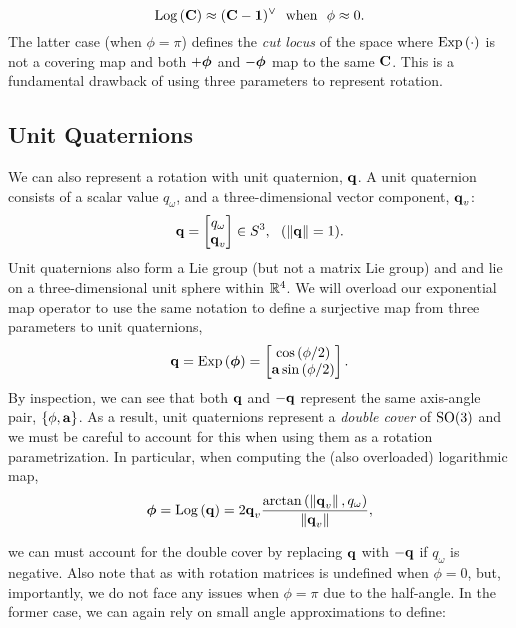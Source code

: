 \begin{equation}
	\mathrm{Log}\left({\boldsymbol{\mathbf{C}}}\right) \approx (\boldsymbol{\mathbf{C}} - \boldsymbol{\mathbf{1}})^\vee ~~ \textrm{when} ~~ \phi \approx 0. 
\end{equation}
The latter case (when $\phi = \pi$) defines the \textit{cut locus} of the space where $\mathrm{Exp}\left({\cdot}\right)$ is not a covering map and both $+\boldsymbol{\mathbf{\phi}}$ and $-\boldsymbol{\mathbf{\phi}}$ map to the same $\boldsymbol{\mathbf{C}}$. This is a fundamental drawback of using three parameters to represent rotation.

\subsection{Unit Quaternions}

We can also represent a rotation with unit quaternion, $\boldsymbol{\mathbf{q}}$. A unit quaternion consists of a scalar value $q_\omega$, and a three-dimensional vector component, $\boldsymbol{\mathbf{q}}_v$:
\begin{equation}
	\boldsymbol{\mathbf{q}} = \begin{bmatrix} q_\omega \\ \boldsymbol{\mathbf{q}}_v \end{bmatrix} \in S^3, ~~ (\left\Vert\boldsymbol{\mathbf{q}}\right\Vert = 1).
\end{equation}
Unit quaternions also form a Lie group \citep{Sola2018-kg} (but not a matrix Lie group) and and lie on a three-dimensional unit sphere within $\mathbb{R}{}^4$. We will overload our exponential map operator to use the same notation to define a surjective map from three parameters to unit quaternions,
\begin{equation}
\boldsymbol{\mathbf{q}} = \mathrm{Exp}\left({\boldsymbol{\mathbf{\phi}}}\right) = \begin{bmatrix} \cos{(\phi/2)} \\ \boldsymbol{\mathbf{a}} \sin{(\phi/2)} \end{bmatrix}.	
\end{equation}
By inspection, we can see that both $\boldsymbol{\mathbf{q}}$ and $-\boldsymbol{\mathbf{q}}$ represent the same axis-angle pair, $\{\phi, \boldsymbol{\mathbf{a}}\}$. As a result, unit quaternions represent a \textit{double cover} of $\mathrm{SO}(3)$ and we must be careful to account for this when using them as a rotation parametrization.
In particular, when computing the (also overloaded) logarithmic map,
\begin{align}
\label{eq:math_quat_log}
	\boldsymbol{\mathbf{\phi}} =  \mathrm{Log}\left({\boldsymbol{\mathbf{q}}}\right) = 2 \boldsymbol{\mathbf{q}}_v \frac{\arctan{(\left\Vert \boldsymbol{\mathbf{q}} _v\right\Vert ,  q_\omega})}{\left\Vert\boldsymbol{\mathbf{q}}_v\right\Vert},
\end{align}

\noindent we can must account for the double cover by replacing $\boldsymbol{\mathbf{q}}$ with $-\boldsymbol{\mathbf{q}}$ if $q_\omega$ is negative. Also note that as with rotation matrices  is undefined when $\phi = 0$, but, importantly, we do not face any issues when $\phi = \pi$ due to the half-angle. In the former case, we can again rely on small angle approximations to define:

